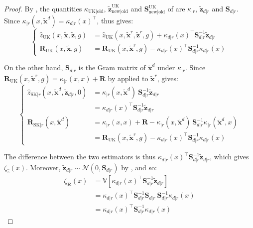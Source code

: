 \begin{proof}
	By , the quantities $\kappa_{\mathrm{UK}|\mathrm{old}}$, $\tilde{\mathbf{z}}_{\mathrm{new}|\mathrm{old}}^{\mathrm{UK}}$ and $\mathbf{S}_{\mathrm{new}|\mathrm{old}}^{\mathrm{UK}}$ of  are $\kappa_{|r}$, $\tilde{\mathbf{z}}_{d|r}$ and $\mathbf{S}_{d|r}$. Since $\kappa_{|r}(x,\tilde{\mathbf{x}}^d)=\kappa_{d|r}(x)^\top$,  thus gives:
	\begin{equation}
		\left\{\begin{aligned}
		\hat{z}_{\mathrm{UK}}(x,\tilde{\mathbf{x}},\tilde{\mathbf{z}},g)&=\hat{z}_{\mathrm{UK}}(x,\tilde{\mathbf{x}}^r,\tilde{\mathbf{z}}^r,g)+\kappa_{d|r}(x)^\top \mathbf{S}_{d|r}^{-1}\tilde{\mathbf{z}}_{d|r}\\
		\mathbf{R}_{\mathrm{UK}}(x,\tilde{\mathbf{x}},g)&=\mathbf{R}_{\mathrm{UK}}(x,\tilde{\mathbf{x}}^r,g)-\kappa_{d|r}(x)^\top \mathbf{S}_{d|r}^{-1}\kappa_{d|r}(x)
		\end{aligned}\right.
	\end{equation}

	On the other hand, $\mathbf{S}_{d|r}$ is the Gram matrix of $\tilde{\mathbf{x}}^d$ under $\kappa_{|r}$. Since $\mathbf{R}_{\mathrm{UK}}(x,\tilde{\mathbf{x}}^r,g)=\kappa_{|r}(x,x)+\mathbf{R}$ by  applied to $\tilde{\mathbf{x}}^r$,  gives:
	\begin{equation}
		\left\{\begin{aligned}
		\hat{z}_{\mathrm{SK}|r}(x,\tilde{\mathbf{x}}^d,\tilde{\mathbf{z}}_{d|r},0)&=\kappa_{|r}(x,\tilde{\mathbf{x}}^d)\:\mathbf{S}_{d|r}^{-1}\tilde{\mathbf{z}}_{d|r}\\
		&=\kappa_{d|r}(x)^\top \mathbf{S}_{d|r}^{-1}\tilde{\mathbf{z}}_{d|r}\\
		\mathbf{R}_{\mathrm{SK}|r}(x,\tilde{\mathbf{x}}^d)&=\kappa_{|r}(x,x)+\mathbf{R}-\kappa_{|r}(x,\tilde{\mathbf{x}}^d)\:\mathbf{S}_{d|r}^{-1}\kappa_{|r}(\tilde{\mathbf{x}}^d,x)\\
		&=\mathbf{R}_{\mathrm{UK}}(x,\tilde{\mathbf{x}}^r,g)-\kappa_{d|r}(x)^\top \mathbf{S}_{d|r}^{-1}\kappa_{d|r}(x)
		\end{aligned}\right.
	\end{equation}

	The difference between the two estimators is thus $\kappa_{d|r}(x)^\top \mathbf{S}_{d|r}^{-1}\tilde{\mathbf{z}}_{d|r}$, which gives $\zeta_{\hat{z}}(x)$. Moreover, $\tilde{\mathbf{z}}_{d|r}\sim\mathcal{N}(0,\mathbf{S}_{d|r})$ by , and so:
	\begin{equation}
		\begin{aligned}
		\zeta_{\mathbf{R}}(x)&=\mathbb{V}\left[\kappa_{d|r}(x)^\top \mathbf{S}_{d|r}^{-1}\tilde{\mathbf{z}}_{d|r}\right]\\
		&=\kappa_{d|r}(x)^\top \mathbf{S}_{d|r}^{-1}\mathbf{S}_{d|r}\:\mathbf{S}_{d|r}^{-1}\kappa_{d|r}(x)\\
		&=\kappa_{d|r}(x)^\top \mathbf{S}_{d|r}^{-1}\kappa_{d|r}(x)
		\end{aligned}
	\end{equation}
\end{proof}

